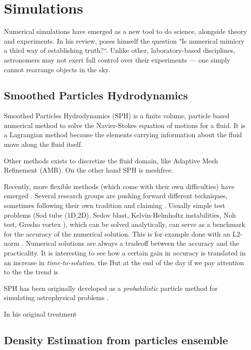 \chapter{Simulations}
\label{ch:simulations}

Numerical simulations have emerged as a new tool to do science, alongside theory and experiments.
In his review, \cite{Heng2014} poses himself the question "Is numerical mimicry a third way of establishing truth?``. Unlike other, laboratory-based disciplines, astronomers may not exert full control over their experiments — one simply cannot rearrange objects in the sky.




\section{Smoothed Particles Hydrodynamics}
Smoothed Particles Hydrodynamics (SPH) is a finite volume, particle based numerical method to solve the Navier-Stokes equation of motions for a fluid.
It is a Lagrangian method because the elements carrying information about the fluid move along the fluid itself.

Other methods exists to discretize the fluid domain, like Adaptive Mesh Refinement (AMR).
On the other hand SPH is meshfree.

Recently, more flexible methods (which come with their own difficulties) have emerged \citep{Springel2010, Shadowfax, Arepo}.
Several research groups are pushing forward different techniques, sometimes following their own tradition and claiming . 
Usually simple test problems (Sod tube (1D,2D), Sedov blast, Kelvin-Helmholtz instabilities, Noh test, Gresho vortex \citet{Gresho1990}), %
which can be solved analytically, can serve as a benchmark for the accuracy of the numerical solution. This is for example done with an L2-norm \citep{Borrow}.
Numerical solutions are always a tradeoff between the accuracy and the practicality.
It is interesting to see how a certain gain in accuracy is translated in an increase in \emph{time-to-solution}. the But at the end of the day if we pay attention to the the trend is 

SPH has been originally developed as a \emph{probabilistic} particle method for simulating astrophysical problems \citep{Lucy1977, Gingold1977}.

In his original treatment 




\section{Density Estimation from particles ensemble}

